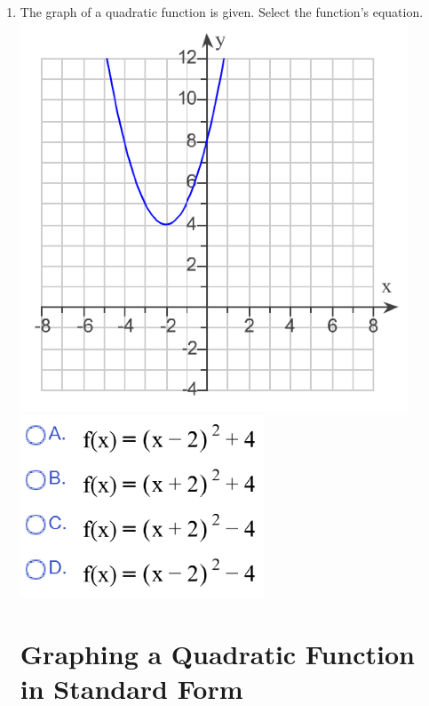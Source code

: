\documentclass[11pt]{article}
\begin{document}
\begin{enumerate}
\item The graph of a quadratic function is given.  Select the function's equation.\\
\includegraphics[scale=.7]{quad1a}\includegraphics[scale=.7]{quad1b}\\




\newpage


\section{Graphing a Quadratic Function in Standard Form}



\end{enumerate}
\end{document}
